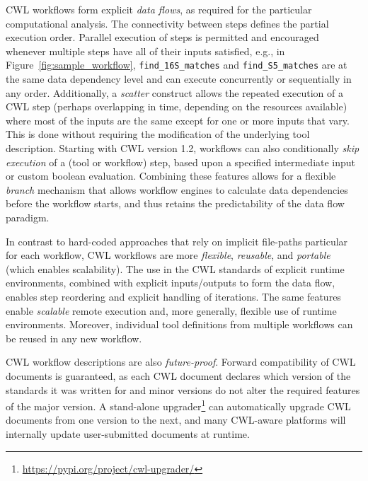 {CWL workflows form explicit \textit{data flows}, as required for the particular computational analysis. The connectivity between steps defines the partial execution order. Parallel execution of steps is permitted and encouraged whenever multiple steps have all of their inputs satisfied, e.g., in Figure~\ref{fig:sample_workflow}, \texttt{find\_16S\_matches} and \texttt{find\_S5\_matches} are at the same data dependency level and can execute concurrently or sequentially in any order. Additionally, a \textit{scatter} construct allows the repeated execution of a CWL step (perhaps overlapping in time, depending on the resources available) where most of the inputs are the same except for one or more inputs that vary. This is done without requiring the modification of the underlying tool description. Starting with CWL version 1.2, workflows can also conditionally \textit{skip execution} of a (tool or workflow) step, based upon a specified intermediate input or custom boolean evaluation. Combining these features allows for a flexible \textit{branch} mechanism that allows workflow engines to calculate data dependencies before the workflow starts, and thus retains the predictability of the data flow paradigm.

In contrast to hard-coded approaches that rely on implicit file-paths particular for each workflow, CWL workflows are more \textit{flexible}, \textit{reusable}, and \textit{portable} (which enables scalability). The use in the CWL standards of explicit runtime environments, combined with explicit inputs/outputs to form the data flow, enables step reordering and explicit handling of iterations. The same features enable \textit{scalable} remote execution and, more generally, flexible use of runtime environments. Moreover, individual tool definitions from multiple workflows can be reused in any new workflow. 

CWL workflow descriptions are also \textit{future-proof}. Forward compatibility of CWL documents is guaranteed, as each CWL document declares which version of the standards it was written for and minor versions do not alter the required features of the major version. A stand-alone upgrader\footnote{\url{https://pypi.org/project/cwl-upgrader/}} can automatically upgrade CWL documents from one version to the next, and many CWL-aware platforms will internally update user-submitted documents at runtime.


}
